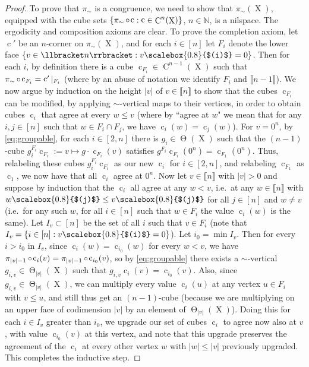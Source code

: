 \documentclass[a4paper,12pt,reqno]{amsart}
\theoremstyle{definition}
\newcommand*{\sbr}[1]{\scalebox{0.8}{$(#1)$}}
\newcommand*{\db}[1]{\llbracket #1\rrbracket}
\newcommand{\mb}{\mathbb}
\DeclareMathOperator{\tran}{\Theta}
\DeclareMathOperator{\q}{c}
\DeclareMathOperator{\ns}{X}
\DeclareMathOperator{\co}{\circ\hspace{-0.02 cm}}
\DeclareMathOperator{\cu}{C}
\begin{document}
\begin{proof}
To prove that $\pi_{\sim}$ is a congruence, we need to show that $\pi_{\sim}(\ns)$, equipped with the cube sets $\{\pi_{\sim}\co\q : \q\in \cu^n(\ns)\}$, $n\in\mb{N}$, is a nilspace. The ergodicity and composition axioms are clear. To prove the completion axiom, let $\q'$ be an $n$-corner on $\pi_{\sim}(\ns)$, and for each $i\in [n]$ let $F_i$ denote the lower face $\{v\in \db{n}:v\sbr{i}=0\}$. Then for each $i$, by definition there is a cube $\q_{F_i}\in \cu^{n-1}(\ns)$ such that $\pi_{\sim}\co \q_{F_i} = \q'|_{F_i}$ (where by an abuse of notation we identify $F_i$ and $\db{n-1}$). We now argue by induction on the height $|v|$ of $v\in \db{n}$ to show that the cubes $\q_{F_i}$ can be modified, by applying $\sim$-vertical maps to their vertices, in order to obtain cubes $\q_i$ that agree at every $w\leq v$ (where by ``agree at $w$" we mean that for any $i,j\in [n]$ such that $w\in F_i\cap F_j$, we have $\q_i(w)=\q_j(w)$). For $v=0^n$, by \eqref{eq:groupable}, for each $i\in [2,n]$ there is $g_i\in \tran(\ns)$ such that the $(n-1)$-cube $g_i^{F_i}\q_{F_i}:= v\mapsto g\cdot \q_{F_i}(v)$ satisfies $g^{F_i}\q_{F_i}(0^n)=\q_{F_1}(0^n)$. Thus, relabeling these cubes $g_i^{F_i}\q_{F_i}$ as our new $\q_i$ for $i\in [2,n]$, and relabeling $\q_{F_1}$ as $\q_1$, we now have that all $\q_i$ agree at $0^n$. Now let $v\in \db{n}$ with  $|v|>0$ and suppose by induction that the $\q_i$ all agree at any $w < v$, i.e.\ at any $w\in \db{n}$ with $w\sbr{j}\leq v\sbr{j}$ for all $j\in [n]$ and $w\neq v$ (i.e.\ for any such $w$, for all $i\in [n]$ such that  $w\in F_i$ the value $\q_i(w)$ is the same). Let $I_v\subset [n]$ be the set of all $i$ such that $v\in F_i$ (note that $I_v=\{i\in [n]: v\sbr{i}=0\}$). Let $i_0=\min I_v$. Then for every $i>i_0$ in $I_v$, since $\q_i(w)=\q_{i_0}(w)$ for every $w<v$, we have $\pi_{|v|-1}\co\q_i(v)=\pi_{|v|-1}\co\q_{i_0}(v)$, so by \eqref{eq:groupable} there exists a $\sim$-vertical $g_{i,v}\in \tran_{|v|}(\ns)$ such that $g_{i,v} \q_i(v) = \q_{i_0}(v)$. Also, since $g_{i,v}\in \tran_{|v|}(\ns)$, we can multiply every value $\q_i(u)$ at any vertex $u\in F_i$ with $v\leq u$, and still thus get an $(n-1)$-cube (because we are multiplying on an upper face of codimension $|v|$ by an element of $\tran_{|v|}(\ns)$). Doing this for each $i\in I_v$ greater than $i_0$, we upgrade our set of cubes $\q_i$ to agree now also at $v$, with value $\q_{i_0}(v)$ at this vertex, and note that this upgrade preserves the agreement of the $\q_i$ at every other vertex $w$ with $|w|\leq |v|$ previously upgraded. This completes the inductive step. 


\end{proof}
\end{document}
